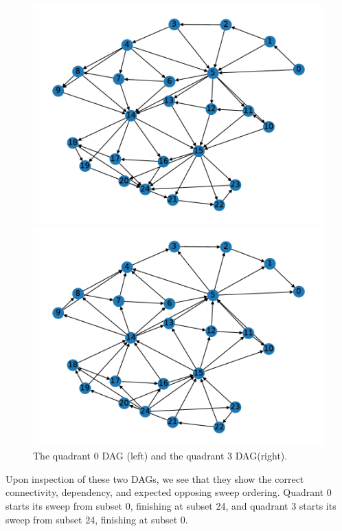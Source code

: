 \begin{figure}[H]
\begin{minipage}[c]{0.5\textwidth}
\includegraphics[scale=0.55]{../../figures/25_graph0.pdf}
\end{minipage}
\begin{minipage}[c]{0.5\textwidth}
\includegraphics[scale=0.55]{../../figures/25_graph3.pdf}
\end{minipage}
\caption{The quadrant 0 DAG (left) and the quadrant 3 DAG(right).}
\label{25_q0q3graphs}
\end{figure}
Upon inspection of these two DAGs, we see that they show the correct connectivity, dependency, and expected opposing sweep ordering. 
Quadrant 0 starts its sweep from subset 0, finishing at subset 24, and quadrant 3 starts its sweep from subset 24, finishing at subset 0.

